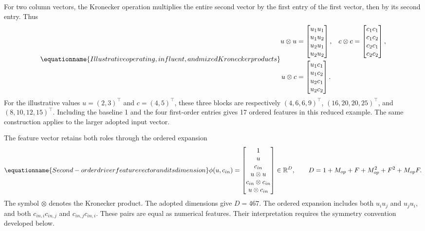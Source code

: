 For two column vectors, the Kronecker operation multiplies the entire second vector by the first entry of the first vector, then by its second entry. Thus
\begin{equation}
\equationname{Illustrative operating, influent, and mixed Kronecker products}
\label{eq:icsor_small_kronecker}
\begin{aligned}
u\otimes u&=\begin{bmatrix}u_1u_1\\u_1u_2\\u_2u_1\\u_2u_2\end{bmatrix},
&c\otimes c&=\begin{bmatrix}c_1c_1\\c_1c_2\\c_2c_1\\c_2c_2\end{bmatrix},\\
u\otimes c&=\begin{bmatrix}u_1c_1\\u_1c_2\\u_2c_1\\u_2c_2\end{bmatrix}.
\end{aligned}
\end{equation}
For the illustrative values \(u=(2,3)^\top\) and \(c=(4,5)^\top\), these three blocks are respectively \((4,6,6,9)^\top\), \((16,20,20,25)^\top\), and \((8,10,12,15)^\top\). Including the baseline 1 and the four first-order entries gives 17 ordered features in this reduced example. The same construction applies to the larger adopted input vector.

The feature vector retains both roles through the ordered expansion
\begin{equation}
\equationname{Second-order driver feature vector and its dimension}
\label{eq:icsor_features}
\phi(u,c_{in})=
\begin{bmatrix}
1\\u\\c_{in}\\u\otimes u\\c_{in}\otimes c_{in}\\u\otimes c_{in}
\end{bmatrix}
\in\mathbb{R}^{D},
\qquad
D=1+M_{op}+F+M_{op}^{2}+F^{2}+M_{op}F.
\end{equation}
The symbol \(\otimes\) denotes the Kronecker product. The adopted dimensions give \(D=467\). The ordered expansion includes both \(u_i u_j\) and \(u_j u_i\), and both \(c_{in,i}c_{in,j}\) and \(c_{in,j}c_{in,i}\). These pairs are equal as numerical features. Their interpretation requires the symmetry convention developed below.

